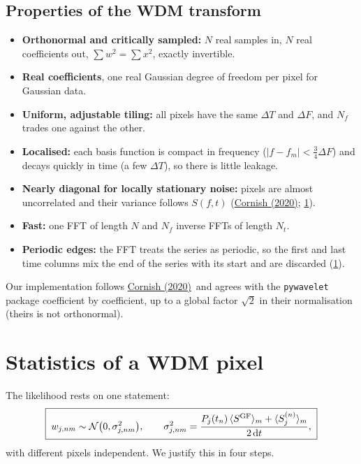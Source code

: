 \documentclass[11pt,a4paper]{article}
\newcommand{\urlCornish}{https://arxiv.org/abs/2009.00043}
\newcommand{\Cornish}{\href{\urlCornish}{Cornish (2020)}}
\newcommand{\dd}{\mathrm{d}}
\begin{document}
\subsection{Properties of the WDM transform}

\begin{itemize}
  \item \textbf{Orthonormal and critically sampled:} $N$ real samples in, $N$ real
        coefficients out, $\sum w^2=\sum x^2$, exactly invertible.
  \item \textbf{Real coefficients}, one real Gaussian degree of freedom per pixel for
        Gaussian data.
  \item \textbf{Uniform, adjustable tiling:} all pixels have the same $\Delta T$ and
        $\Delta F$, and $N_f$ trades one against the other.
  \item \textbf{Localised:} each basis function is compact in frequency
        ($|f-f_m|<\tfrac34\Delta F$) and decays quickly in time (a few $\Delta T$), so
        there is little leakage.
  \item \textbf{Nearly diagonal for locally stationary noise:} pixels are almost
        uncorrelated and their variance follows $S(f,t)$ (\Cornish; \cref{sec:wstats}).
  \item \textbf{Fast:} one FFT of length $N$ and $N_f$ inverse FFTs of length $N_t$.
  \item \textbf{Periodic edges:} the FFT treats the series as periodic, so the first
        and last time columns mix the end of the series with its start and are
        discarded (\cref{sec:wstats}).
\end{itemize}
Our implementation follows \Cornish\ and agrees with the \texttt{pywavelet} package
coefficient by coefficient, up to a global factor $\sqrt2$ in their normalisation
(theirs is not orthonormal).

\section{Statistics of a WDM pixel}\label{sec:wstats}

The likelihood rests on one statement:
\begin{equation}
  \boxed{\;w_{j,nm}\sim\mathcal N\big(0,\sigma^2_{j,nm}\big),\qquad
  \sigma^2_{j,nm} = \frac{P_j(t_n)\,\langle S^{\rm GF}\rangle_m + \langle S^{(n)}_j\rangle_m}{2\,\dd t},
\;}
  \label{eq:pixvar}
\end{equation}
with different pixels independent. We justify this in four steps.
\end{document}
